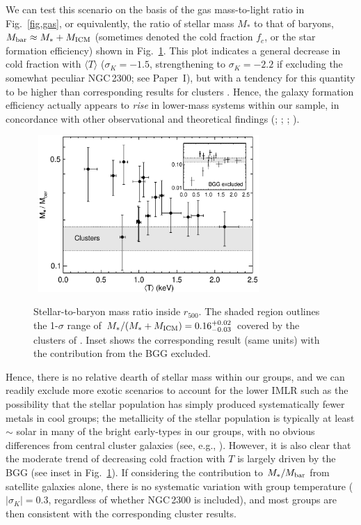 \documentclass[useAMS,usenatbib]{mn2e}
\begin{document}
We can test this scenario on the basis of the gas mass-to-light ratio
in Fig.~\ref{fig,gas}, or equivalently, the ratio of stellar mass
$M_\ast$ to that of baryons, $M_{\rm bar}\approx M_\ast + M_{\rm ICM}$
(sometimes denoted the cold fraction $f_c$, or the star formation
efficiency) shown in Fig.~\ref{fig,starbar}. This plot indicates a
general decrease in cold fraction with $\langle T\rangle$
($\sigma_K=-1.5$, strengthening to $\sigma_K=-2.2$ if excluding the
somewhat peculiar NGC\,2300; see Paper~I), but with a tendency for
this quantity to be higher than corresponding results for clusters
\citep{etto03}. Hence, the galaxy formation efficiency actually
appears to {\em rise} in lower-mass systems within our sample, in
concordance with other observational and theoretical findings
(\citealt{lin03}; \citealt{rome06}; \citealt*{gonz07};
\citealt{dave08}).
\begin{figure} 
\mbox{\hspace{-1mm} 
 \includegraphics[width=84mm]{fig13.eps}}
 \caption{Stellar-to-baryon mass ratio inside $r_{500}$. The shaded
   region outlines the 1-$\sigma$ range of $M_\ast /(M_\ast + M_{\rm
   ICM}) = 0.16^{+0.02}_{-0.03}$ covered by the clusters of
   \citet{etto03}. Inset shows the corresponding result (same units)
   with the contribution from the BGG excluded.}
\label{fig,starbar} 
\end{figure} 
Hence, there is no relative dearth of stellar mass within our groups,
and we can readily exclude more exotic scenarios to account for the
lower IMLR such as the possibility that the stellar population has
simply produced systematically fewer metals in cool groups; the
metallicity of the stellar population is typically at least $\sim$
solar in many of the bright early-types in our groups, with no obvious
differences from central cluster galaxies (see, e.g.,
\citealt{hump06,brou07}). However, it is also clear that the moderate
trend of decreasing cold fraction with $T$ is largely driven by the
BGG (see inset in Fig.~\ref{fig,starbar}). If considering the
contribution to $M_\ast /M_{\rm bar}$ from satellite galaxies alone,
there is no systematic variation with group temperature
($|\sigma_K|=0.3$, regardless of whether NGC\,2300 is included), and
most groups are then consistent with the corresponding cluster
results.
\end{document}
